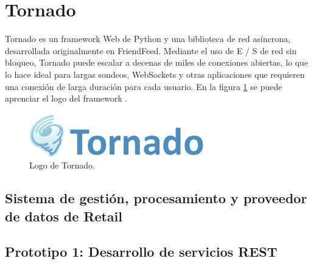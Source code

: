 \section{Tornado}
Tornado es un framework Web de Python y una biblioteca de red asíncrona, desarrollada originalmente en FriendFeed. Mediante el uso de E / S de red sin bloqueo, Tornado puede escalar a decenas de miles de conexiones abiertas, lo que lo hace ideal para largas sondeos, WebSockets y otras aplicaciones que requieren una conexión de larga duración para cada usuario. En la figura \ref{tornado} se puede aprenciar el logo del framework \cite{Tornado}. 

\FloatBarrier
\begin{figure}[htbp!]
		\centering
			\includegraphics[width=0.3 \textwidth]{imagenes/tornado}
		\caption{Logo de Tornado. \cite{Tornado}}
		\label{tornado}
\end{figure}
\FloatBarrier

\subsection{Sistema de gestión, procesamiento y proveedor de datos de Retail}

\subsection{Prototipo 1: Desarrollo de servicios REST}

